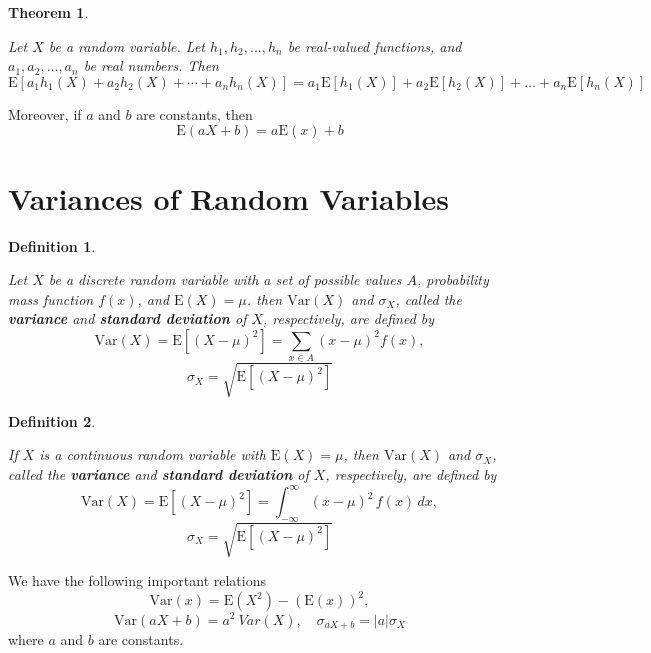 \documentclass[
]{book}
\newtheorem{theorem}{Theorem}[chapter]
\theoremstyle{definition}
\newtheorem{definition}{Definition}[chapter]
\theoremstyle{definition}
\theoremstyle{definition}
\theoremstyle{definition}
\theoremstyle{remark}
\begin{document}
\begin{theorem}
\protect\hypertarget{thm:unlabeled-div-9}{}\label{thm:unlabeled-div-9}

\emph{Let \(X\) be a random variable. Let
\(h_1, h_2, . . . , h_n\) be real-valued functions, and
\(a_1, a_2, \ldots, a_n\) be real numbers. Then
\[\mathrm{E}[a_1 h_1(X) + a_2 h_2(X) + \cdots + a_n h_n(X)] = a_1 \mathrm{E}[h_1(X)] + a_2 \mathrm{E}[h_2(X)] + \ldots +
    a_n \mathrm{E}[h_n(X)]\]}

\end{theorem}

Moreover, if \(a\) and \(b\) are constants, then
\[\mathrm{E}(aX +b) = a\mathrm{E}(x) + b\]

\hypertarget{variances-of-random-variables}{%
\section{Variances of Random Variables}\label{variances-of-random-variables}}

\begin{definition}
\protect\hypertarget{def:unlabeled-div-10}{}\label{def:unlabeled-div-10}

\emph{Let \(X\) be a discrete random variable with a set of
possible values \(A\), probability mass function \(f(x)\), and
\(\mathrm{E}(X) = \mu\). then \(\mathrm{Var}(X)\) and \(\sigma_X\), called the
\textbf{variance} and \textbf{standard deviation} of \(X\), respectively, are
defined by
\[\mathrm{Var}(X) = \mathrm{E}[(X- \mu)^2] = \sum_{x \in A} (x - \mu)^2 f(x),\]
\[\sigma_X = \sqrt{\mathrm{E}[(X- \mu)^2]}\]}

\end{definition}

\begin{definition}
\protect\hypertarget{def:unlabeled-div-11}{}\label{def:unlabeled-div-11}

\emph{If \(X\) is a continuous random variable with
\(\mathrm{E}(X) = \mu\), then \(\mathrm{Var}(X)\) and \(\sigma_X\), called the
\textbf{variance} and \textbf{standard deviation} of \(X\), respectively, are
defined by
\[\mathrm{Var}(X) = \mathrm{E}[(X- \mu)^2] =  \int_{-\infty}^\infty (x - \mu)^2\, f(x)\, dx ,\]
\[\sigma_X = \sqrt{\mathrm{E}[(X- \mu)^2]}\]}

\end{definition}

We have the following important relations
\[\mathrm{Var}(x) = \mathrm{E}(X^2) - (\mathrm{E}(x))^2 ,\]
\[\mathrm{Var}(aX + b) = a^2\ Var(X), \quad   \sigma_{aX + b}= |a|\sigma_X\]
where \(a\) and \(b\) are constants.
\end{document}
